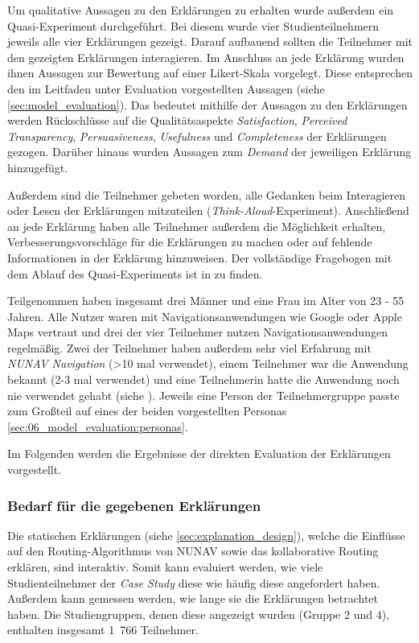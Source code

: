 Um qualitative Aussagen zu den Erklärungen zu erhalten wurde außerdem ein Quasi-Experiment durchgeführt. Bei diesem wurde vier Studienteilnehmern jeweils alle vier Erklärungen gezeigt. Darauf aufbauend sollten die Teilnehmer mit den gezeigten Erklärungen interagieren. Im Anschluss an jede Erklärung wurden ihnen Aussagen zur Bewertung auf einer Likert-Skala vorgelegt. Diese entsprechen den im Leitfaden unter Evaluation vorgestellten Aussagen (siehe \autoref{sec:model_evaluation}). Das bedeutet mithilfe der Aussagen zu den Erklärungen werden Rückschlüsse auf die Qualitätsaspekte \textit{Satisfaction}, \textit{Perceived Transparency}, \textit{Persuasiveness}, \textit{Usefulness} und \textit{Completeness} der Erklärungen gezogen. Darüber hinaus wurden Aussagen zum \textit{Demand} der jeweiligen Erklärung hinzugefügt.

Außerdem sind die Teilnehmer gebeten worden, alle Gedanken beim Interagieren oder Lesen der Erklärungen mitzuteilen (\textit{Think-Aloud}-Experiment). Anschließend an jede Erklärung haben alle Teilnehmer außerdem die Möglichkeit erhalten, Verbesserungsvorschläge für die Erklärungen zu machen oder auf fehlende Informationen in der Erklärung hinzuweisen. Der vollständige Fragebogen mit dem Ablauf des Quasi-Experiments ist in  zu finden.

Teilgenommen haben insgesamt drei Männer und eine Frau im Alter von 23 - 55 Jahren. Alle Nutzer waren mit Navigationsanwendungen wie Google oder Apple Maps vertraut und drei der vier Teilnehmer nutzen Navigationsanwendungen regelmäßig. Zwei der Teilnehmer haben außerdem sehr viel Erfahrung mit \textit{NUNAV Navigation} (>10 mal verwendet), einem Teilnehmer war die Anwendung bekannt (2-3 mal verwendet) und eine Teilnehmerin hatte die Anwendung noch nie verwendet gehabt (siehe ). Jeweils eine Person der Teilnehmergruppe passte zum Großteil auf eines der beiden vorgestellten Personas \autoref{sec:06_model_evaluation:personas}.

Im Folgenden werden die Ergebnisse der direkten Evaluation der Erklärungen vorgestellt.

\subsubsection{Bedarf für die gegebenen Erklärungen}
\label{sec:demand_qualitative_evaluation}

Die statischen Erklärungen (siehe \autoref{sec:explanation_design}), welche die Einflüsse auf den Routing-Algorithmus von NUNAV sowie das kollaborative Routing erklären, sind interaktiv. Somit kann evaluiert werden, wie viele Studienteilnehmer der \textit{Case Study} diese wie häufig diese angefordert haben. Außerdem kann gemessen werden, wie lange sie die Erklärungen betrachtet haben. Die Studiengruppen, denen diese angezeigt wurden (Gruppe 2 und 4), enthalten insgesamt 1~766 Teilnehmer.

